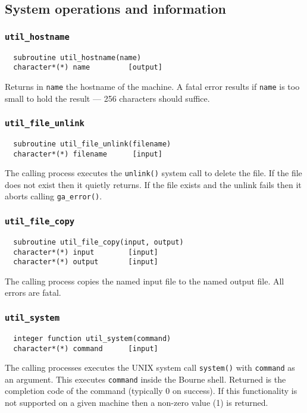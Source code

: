 \subsection{System operations and information}

\subsubsection{{\tt util\_hostname}}
\begin{verbatim}
  subroutine util_hostname(name)
  character*(*) name         [output]
\end{verbatim}
Returns in {\tt name} the hostname of the machine.  A fatal error
results if {\tt name} is too small to hold the result --- 256
characters should suffice.

\subsubsection{{\tt util\_file\_unlink}}
\begin{verbatim}
  subroutine util_file_unlink(filename)
  character*(*) filename      [input]
\end{verbatim}
The calling process executes the \verb+unlink()+ system call to delete
the file.  If the file does not exist then it quietly returns.  If the
file exists and the unlink fails then it aborts calling
\verb+ga_error()+.

\subsubsection{{\tt util\_file\_copy}}
\begin{verbatim}
  subroutine util_file_copy(input, output)
  character*(*) input        [input]
  character*(*) output       [input]
\end{verbatim}
The calling process copies the named input file to the named output
file.  All errors are fatal.

\subsubsection{{\tt util\_system}}
\begin{verbatim}
  integer function util_system(command)
  character*(*) command      [input]
\end{verbatim}
The calling processes executes the UNIX system call \verb+system()+
with \verb+command+ as an argument.  This executes \verb+command+
inside the Bourne shell.  Returned is the completion code of the
command (typically 0 on success). If this functionality is not
supported on a given machine then a non-zero value (1) is returned.

